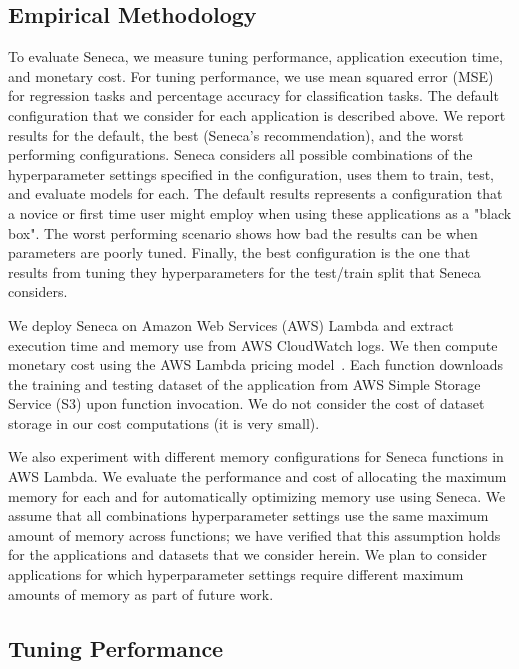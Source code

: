 \subsection{Empirical Methodology}
To evaluate Seneca, we measure tuning performance, application execution time, and monetary cost.
For tuning performance, we use mean squared error (MSE) for regression tasks 
and percentage accuracy for
classification tasks. The default configuration that we 
consider for each application is described above.
We report results for the default, the best (Seneca's recommendation), 
and the worst performing configurations.  Seneca considers all possible combinations 
of the hyperparameter settings specified in the configuration, uses them
to train, test, and evaluate models for each. 
The default results represents a configuration that a novice or first time 
user might employ when using these applications
as a "black box".  The worst performing scenario shows how bad the results can be
when parameters are poorly tuned.  Finally, the best configuration 
is the one that results from tuning they hyperparameters for the test/train split
that Seneca considers.  

We deploy Seneca on Amazon Web Services (AWS) Lambda and extract
execution time and memory use from AWS CloudWatch logs.  
We then compute monetary cost
using the AWS Lambda pricing model~\cite{ref:pricing}.
Each function downloads the training and testing dataset 
of the application from AWS Simple Storage Service (S3) upon function invocation. 
We do not consider the cost of dataset storage in our cost computations (it is very small).

We also experiment with different memory configurations for Seneca functions in AWS Lambda.  
We evaluate
the performance and cost of allocating the maximum memory for each and for automatically optimizing 
memory use using Seneca. We assume that all combinations hyperparameter settings use the 
same maximum amount of memory across functions; we 
have verified that this assumption holds for the applications and datasets that
we consider herein.
We plan to consider applications for which hyperparameter settings require 
different maximum amounts of memory as part of future work.  

\subsection{Tuning Performance}

